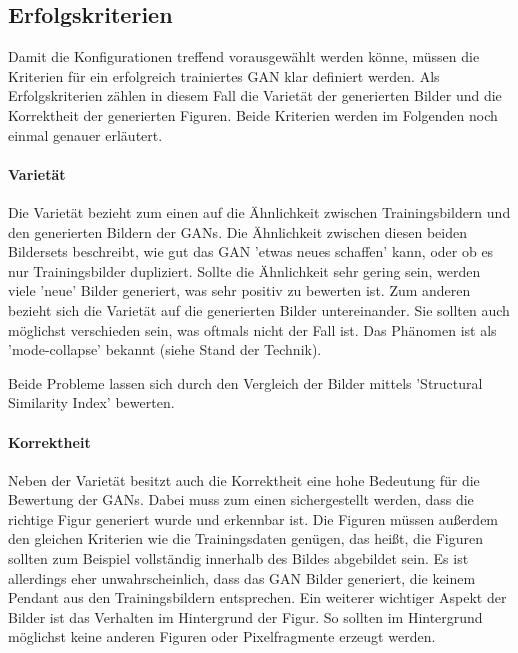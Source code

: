 \subsection{Erfolgskriterien}
Damit die Konfigurationen treffend vorausgewählt werden könne, müssen die Kriterien für ein erfolgreich trainiertes GAN klar definiert werden.
Als Erfolgskriterien zählen in diesem Fall die Varietät der generierten Bilder und die Korrektheit der generierten Figuren.
Beide Kriterien werden im Folgenden noch einmal genauer erläutert.

\paragraph{Varietät}
Die Varietät bezieht zum einen auf die Ähnlichkeit zwischen Trainingsbildern und den generierten Bildern der GANs.
Die Ähnlichkeit zwischen diesen beiden Bildersets beschreibt, wie gut das GAN 'etwas neues schaffen' kann, oder ob es nur Trainingsbilder dupliziert.
Sollte die Ähnlichkeit sehr gering sein, werden viele 'neue' Bilder generiert, was sehr positiv zu bewerten ist.
Zum anderen bezieht sich die Varietät auf die generierten Bilder untereinander.
Sie sollten auch möglichst verschieden sein, was oftmals nicht der Fall ist.
Das Phänomen ist als 'mode-collapse' bekannt (siehe Stand der Technik). %

Beide Probleme lassen sich durch den Vergleich der Bilder mittels 'Structural Similarity Index' \cite{structural-similarity-index} bewerten.

\paragraph{Korrektheit}
Neben der Varietät besitzt auch die Korrektheit eine hohe Bedeutung für die Bewertung der GANs.
Dabei muss zum einen sichergestellt werden, dass die richtige Figur generiert wurde und erkennbar ist.
Die Figuren müssen außerdem den gleichen Kriterien wie die Trainingsdaten genügen, das heißt, die Figuren sollten zum Beispiel vollständig innerhalb des Bildes abgebildet sein.
Es ist allerdings eher unwahrscheinlich, dass das GAN Bilder generiert, die keinem Pendant aus den Trainingsbildern entsprechen.
Ein weiterer wichtiger Aspekt der Bilder ist das Verhalten im Hintergrund der Figur.
So sollten im Hintergrund möglichst keine anderen Figuren oder Pixelfragmente erzeugt werden.

